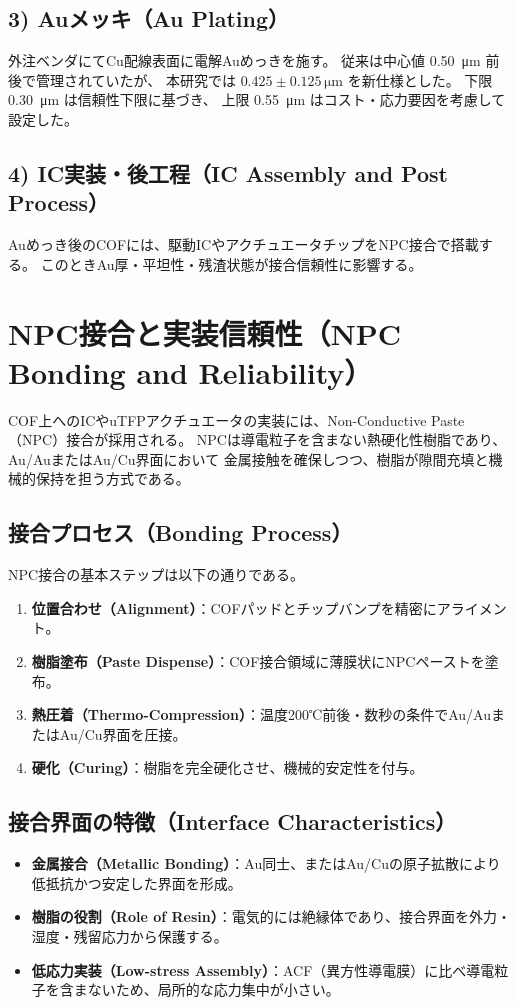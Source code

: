 \documentclass[conference]{IEEEtran}
\begin{document}
\subsection*{3) Auメッキ（Au Plating）}
外注ベンダにてCu配線表面に電解Auめっきを施す。
従来は中心値 \SI{0.50}{\micro\meter} 前後で管理されていたが、
本研究では \textbf{$0.425 \pm 0.125\,\si{\micro\meter}$} を新仕様とした。
下限 \SI{0.30}{\micro\meter} は信頼性下限に基づき、
上限 \SI{0.55}{\micro\meter} はコスト・応力要因を考慮して設定した。

\subsection*{4) IC実装・後工程（IC Assembly and Post Process）}
Auめっき後のCOFには、駆動ICやアクチュエータチップをNPC接合で搭載する。
このときAu厚・平坦性・残渣状態が接合信頼性に影響する。

\section{NPC接合と実装信頼性（NPC Bonding and Reliability）}
COF上へのICやuTFPアクチュエータの実装には、Non-Conductive Paste（NPC）接合が採用される。
NPCは導電粒子を含まない熱硬化性樹脂であり、Au/AuまたはAu/Cu界面において
金属接触を確保しつつ、樹脂が隙間充填と機械的保持を担う方式である。

\subsection*{接合プロセス（Bonding Process）}
NPC接合の基本ステップは以下の通りである。
\begin{enumerate}
  \item \textbf{位置合わせ（Alignment）}：COFパッドとチップバンプを精密にアライメント。
  \item \textbf{樹脂塗布（Paste Dispense）}：COF接合領域に薄膜状にNPCペーストを塗布。
  \item \textbf{熱圧着（Thermo-Compression）}：温度200℃前後・数秒の条件でAu/AuまたはAu/Cu界面を圧接。
  \item \textbf{硬化（Curing）}：樹脂を完全硬化させ、機械的安定性を付与。
\end{enumerate}

\subsection*{接合界面の特徴（Interface Characteristics）}
\begin{itemize}
  \item \textbf{金属接合（Metallic Bonding）}：Au同士、またはAu/Cuの原子拡散により低抵抗かつ安定した界面を形成。
  \item \textbf{樹脂の役割（Role of Resin）}：電気的には絶縁体であり、接合界面を外力・湿度・残留応力から保護する。
  \item \textbf{低応力実装（Low-stress Assembly）}：ACF（異方性導電膜）に比べ導電粒子を含まないため、局所的な応力集中が小さい。
\end{itemize}
\end{document}
